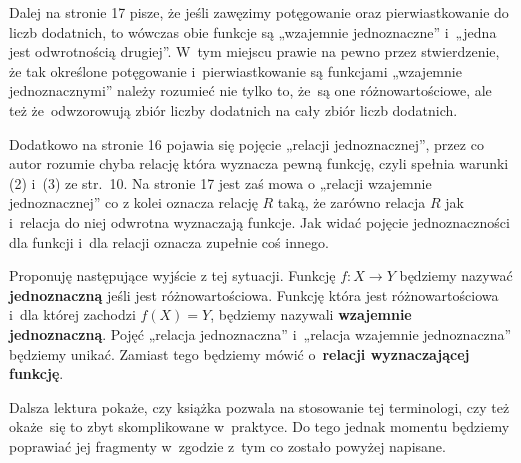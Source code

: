 \documentclass[a4paper,11pt]{article}
\numberwithin{equation}{section}
\begin{document}
Dalej na stronie 17 pisze, że jeśli zawęzimy potęgowanie oraz
pierwiastkowanie do liczb dodatnich, to wówczas obie funkcje są
„wzajemnie jednoznaczne” i~„jedna jest odwrotnością drugiej”. W~tym
miejscu prawie na pewno przez stwierdzenie, że tak określone
potęgowanie i~pierwiastkowanie są funkcjami „wzajemnie jednoznacznymi”
należy rozumieć nie tylko to, że~są one różnowartościowe, ale też
że~odwzorowują zbiór liczby dodatnich na cały zbiór liczb dodatnich.

Dodatkowo na stronie 16 pojawia się pojęcie „relacji jednoznacznej”,
przez co autor rozumie chyba relację która wyznacza pewną funkcję,
czyli spełnia warunki (2) i~(3) ze str.~10. Na stronie 17 jest zaś
mowa o „relacji wzajemnie jednoznacznej” co z kolei oznacza relację
$R$ taką, że zarówno relacja $R$ jak i~relacja do niej odwrotna
wyznaczają funkcje. Jak widać pojęcie jednoznaczności dla funkcji
i~dla relacji oznacza zupełnie coś innego.

Proponuję następujące wyjście z tej sytuacji. Funkcję $f: X \to Y$
będziemy nazywać \textbf{jednoznaczną} jeśli jest różnowartościowa.
Funkcję która jest różnowartościowa i~dla której zachodzi
$f( X ) = Y$, będziemy nazywali \textbf{wzajemnie jednoznaczną}. Pojęć
„relacja jednoznaczna” i~„relacja wzajemnie jednoznaczna” będziemy
unikać. Zamiast tego będziemy mówić o~\textbf{relacji wyznaczającej funkcję}.

Dalsza lektura pokaże, czy książka pozwala na stosowanie tej
terminologi, czy też okaże~się to zbyt skomplikowane w~praktyce. Do
tego jednak momentu będziemy poprawiać jej fragmenty w~zgodzie z~tym
co zostało powyżej napisane.






\newpage

\end{document}

